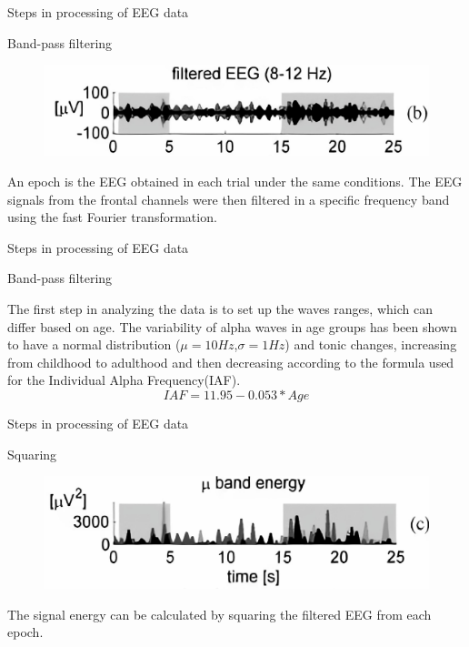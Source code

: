 \documentclass{beamer}
\begin{document}
\begin{frame}
{\centerline{Steps in processing of EEG data}}
{\centerline{Band-pass filtering}}
\begin{figure}
    \centering
    \includegraphics[width=\linewidth]{P2023.AIBCCSS.BrainSignals/banpass filtering.jpg}
\end{figure}
    An epoch is the EEG obtained in each trial under the same conditions. The EEG signals from the frontal channels were then filtered in a specific frequency band using the fast Fourier transformation.
\end{frame}

\begin{frame}
{\centerline{Steps in processing of EEG data}}
{\centerline{Band-pass filtering}}
The first step in analyzing the data is to set up the waves ranges, which can differ based on age. The variability of alpha waves in age groups has been shown to have a normal distribution ($\mu=10Hz$,$\sigma=1Hz$) and tonic changes, increasing from childhood to adulthood and then decreasing according to the formula used for the Individual Alpha Frequency(IAF).
$$IAF=11.95 - 0.053 * Age$$
\end{frame}

\begin{frame}
{\centerline{Steps in processing of EEG data}}
{\centerline{Squaring}}
    \begin{figure}
        \centering
        \includegraphics[width=\linewidth]{P2023.AIBCCSS.BrainSignals/squaring.jpg}
    \end{figure}
    The signal energy can be calculated by squaring the filtered EEG from each epoch.
\end{frame}
\end{document}
